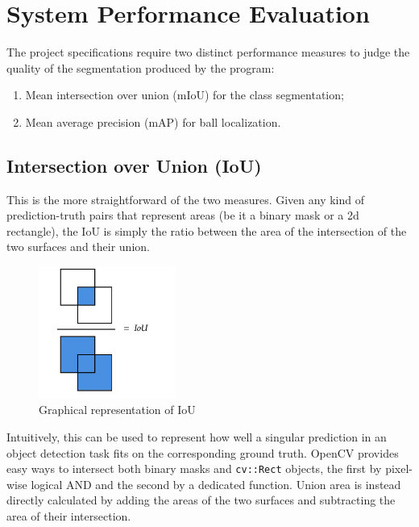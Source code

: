 
\section{System Performance Evaluation}

The project specifications require two distinct performance 
measures to judge the quality of the segmentation produced 
by the program:

\begin{enumerate}
    \item Mean intersection over union (mIoU) for the class segmentation;
    \item Mean average precision (mAP) for ball localization.
\end{enumerate}



\subsection{Intersection over Union (IoU)}

This is the more straightforward of the two measures. 
Given any kind of prediction-truth pairs that represent 
areas (be it a binary mask or a 2d rectangle), the IoU is 
simply the ratio between the area of the intersection of the 
two surfaces and their union.

\begin{figure}[h]
    \centering
    \includegraphics[width=0.4\textwidth]{./imgs/iou.png}
    \caption{Graphical representation of IoU}
\end{figure}

Intuitively, this can be used to represent how well a singular 
prediction in an object detection task fits on the corresponding 
ground truth.
OpenCV provides easy ways to intersect both binary masks and 
\verb|cv::Rect| objects, the first by pixel-wise logical AND 
and the second by a dedicated function.
Union area is instead directly calculated by adding the 
areas of the two surfaces and subtracting the area of 
their intersection.


